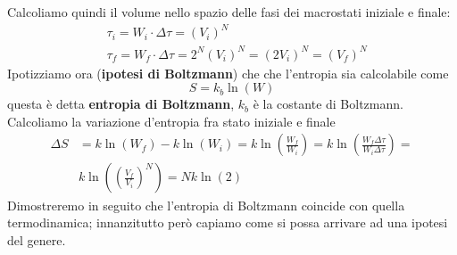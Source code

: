 \documentclass[
10pt, %
a4paper, %
oneside, %
headinclude,footinclude, %
BCOR5mm, %
]{scrartcl}
\begin{document}
Calcoliamo quindi il volume nello spazio delle fasi dei macrostati iniziale e finale:
\begin{align*}
	&\tau_i = W_i\cdot\Delta\tau = (V_i)^N \\
	&\tau_f = W_f\cdot\Delta\tau = 2^N(V_i)^N=(2 V_i)^N = (V_f)^N
\end{align*}
Ipotizziamo ora (\textbf{ipotesi di Boltzmann}) che che l'entropia sia calcolabile come
\[S=k_b\ln(W)\]
questa è detta \textbf{entropia di Boltzmann}, \(k_b\) è la costante di Boltzmann.\\
Calcoliamo la variazione d'entropia fra stato iniziale e finale
\begin{align*}
	\Delta S &= k\ln(W_{f})-k\ln(W_{i})=k\ln\left(\frac{W_f}{W_i}\right)=k\ln\left(\frac{W_f\Delta\tau}{W_i\Delta\tau}\right)=\\
	 &k\ln\left(\left(\frac{V_f}{V_i}\right)^N\right)=Nk\ln(2)
\end{align*}
Dimostreremo in seguito che l'entropia di Boltzmann coincide con quella termodinamica; innanzitutto però capiamo come si possa arrivare ad una ipotesi del genere.\\
\end{document}
